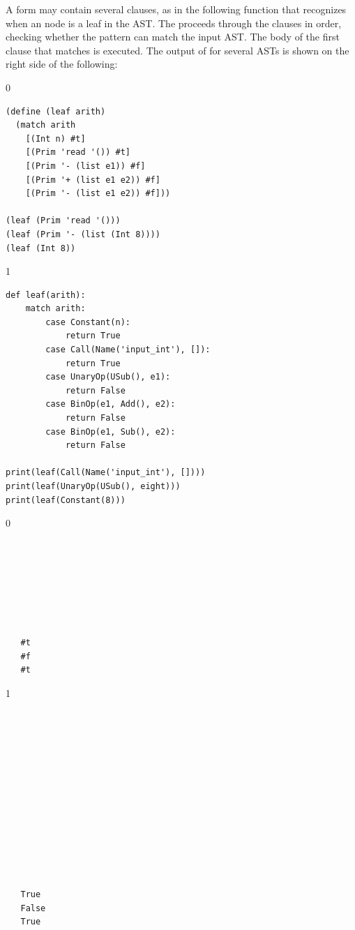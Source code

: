 \documentclass[7x10]{TimesAPriori_MIT}%
\def\racketEd{0}
\def\pythonEd{1}
\providecommand{\BookEdition}{1}
\let\edition\BookEdition
\newcommand{\pythonColor}[0]{}
\numberwithin{theorem}{chapter}
\numberwithin{definition}{chapter}
\numberwithin{equation}{chapter}
\begin{document}
A  form may contain several clauses, as in the following
function  that recognizes when an \LangInt{} node is a leaf in
the AST. The  proceeds through the clauses in order,
checking whether the pattern can match the input AST. The body of the
first clause that matches is executed. The output of  for
several ASTs is shown on the right side of the following:
\begin{center}
\begin{minipage}{0.6\textwidth}
{\if\edition\racketEd
\begin{lstlisting}
(define (leaf arith)
  (match arith
    [(Int n) #t]
    [(Prim 'read '()) #t]
    [(Prim '- (list e1)) #f]
    [(Prim '+ (list e1 e2)) #f]
    [(Prim '- (list e1 e2)) #f]))

(leaf (Prim 'read '()))
(leaf (Prim '- (list (Int 8))))
(leaf (Int 8))
\end{lstlisting}
\fi}
{\if\edition\pythonEd\pythonColor
\begin{lstlisting}
def leaf(arith):
    match arith:
        case Constant(n):
            return True
        case Call(Name('input_int'), []):
            return True
        case UnaryOp(USub(), e1):
            return False
        case BinOp(e1, Add(), e2):
            return False
        case BinOp(e1, Sub(), e2):
            return False

print(leaf(Call(Name('input_int'), [])))
print(leaf(UnaryOp(USub(), eight)))
print(leaf(Constant(8)))
\end{lstlisting}
\fi}
\end{minipage}
\vrule
\begin{minipage}{0.25\textwidth}
{\if\edition\racketEd  
  \begin{lstlisting}






    
   #t
   #f
   #t
\end{lstlisting}
  \fi}
{\if\edition\pythonEd\pythonColor
\begin{lstlisting}

  





    




   
   True
   False
   True
\end{lstlisting}
\fi}
\end{minipage}
\end{center}
\end{document}
